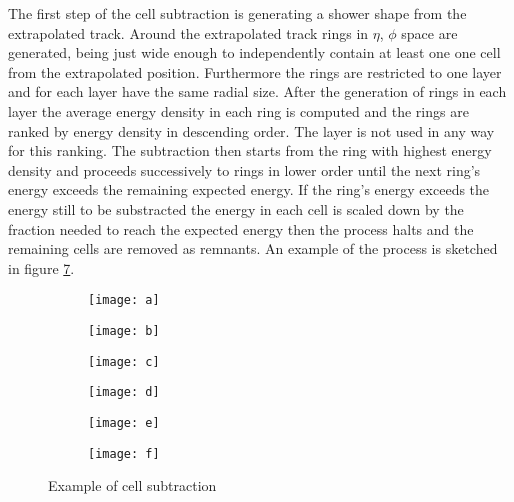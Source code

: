 The first step of the cell subtraction is generating a shower shape from the extrapolated track. Around the extrapolated track rings in $\eta$, $\phi$ space are generated, being just wide enough to independently contain at least one one cell from the extrapolated position. Furthermore the rings are restricted to one layer and for each layer have the same radial size.
After the generation of rings in each layer the average energy density in each ring is computed and the rings are ranked by energy density in descending order. The layer is not used in any way for this ranking.
The subtraction then starts from the ring with highest energy density and proceeds successively to rings in lower order until the next ring's energy exceeds the remaining expected energy.
If the ring's energy exceeds the energy still to be substracted the energy in each cell is scaled down by the fraction needed to reach the expected energy then the process halts and the remaining cells are removed as remnants.
An example of the process is sketched in figure \ref{fig:sub}. 


\begin{figure}[htbp]
  \centering
  \begin{subfigure}[b]{0.3\figwidth}
    \texttt{[image: a]}
    \caption{}\label{fig:sub-a}
  \end{subfigure}
  \begin{subfigure}[b]{0.3\figwidth}
    \texttt{[image: b]}
    \caption{}\label{fig:sub-b}
  \end{subfigure}
  \begin{subfigure}[b]{0.3\figwidth}
    \texttt{[image: c]}
    \caption{}\label{fig:sub-c}
  \end{subfigure}
  \begin{subfigure}[b]{0.3\figwidth}
    \texttt{[image: d]}
    \caption{}\label{fig:sub-d}
  \end{subfigure}
    
    
  \begin{subfigure}[b]{0.3\figwidth}
        \texttt{[image: e]}
        \caption{}\label{fig:sub-e}
  \end{subfigure}
  \begin{subfigure}[b]{0.3\figwidth}
        \texttt{[image: f]}
        \caption{}\label{fig:sub-f}
  \end{subfigure}
  \caption{Example of cell subtraction \cite{pflowpaper}}
  \label{fig:sub}
\end{figure}

